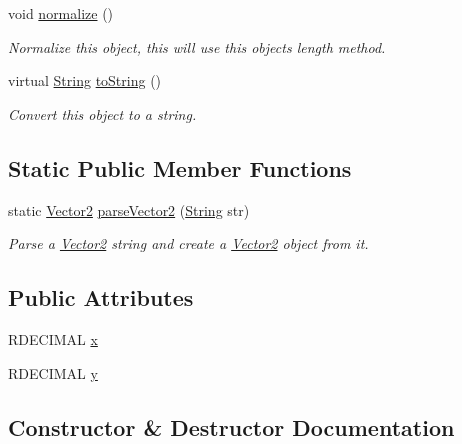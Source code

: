 \begin{DoxyCompactItemize}
void \hyperlink{class_rad_j_a_v_1_1_vector2_abccc47b7aaeb61ff785cf3f65a15d753}{normalize} ()
\begin{DoxyCompactList}\small\item\em Normalize this object, this will use this object\textquotesingle{}s length method. \end{DoxyCompactList}\item 
virtual \hyperlink{class_rad_j_a_v_1_1_string}{String} \hyperlink{class_rad_j_a_v_1_1_vector2_a500b4dd1d0bd63cfa28a02c462cd9414}{to\+String} ()
\begin{DoxyCompactList}\small\item\em Convert this object to a string. \end{DoxyCompactList}\end{DoxyCompactItemize}
\subsection*{Static Public Member Functions}
\begin{DoxyCompactItemize}
\item 
static \hyperlink{class_rad_j_a_v_1_1_vector2}{Vector2} \hyperlink{class_rad_j_a_v_1_1_vector2_a9b3839229bae353b0abd7e7ff0065b37}{parse\+Vector2} (\hyperlink{class_rad_j_a_v_1_1_string}{String} str)
\begin{DoxyCompactList}\small\item\em Parse a \hyperlink{class_rad_j_a_v_1_1_vector2}{Vector2} string and create a \hyperlink{class_rad_j_a_v_1_1_vector2}{Vector2} object from it. \end{DoxyCompactList}\end{DoxyCompactItemize}
\subsection*{Public Attributes}
\begin{DoxyCompactItemize}
\item 
R\+D\+E\+C\+I\+M\+AL \hyperlink{class_rad_j_a_v_1_1_vector2_a0c7b2ac402b2594c86071930bdb396fe}{x}
\item 
R\+D\+E\+C\+I\+M\+AL \hyperlink{class_rad_j_a_v_1_1_vector2_a98eaf64b58e2c602544b1b4e11702e9c}{y}
\end{DoxyCompactItemize}


\subsection{Constructor \& Destructor Documentation}
